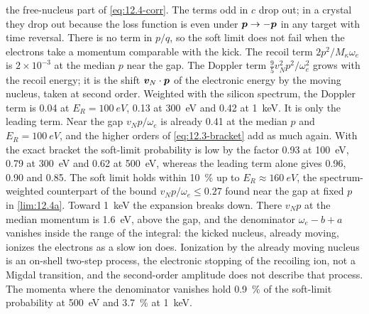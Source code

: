 the free-nucleus part of \cref{eq:12.4-corr}. The terms odd in $c$ drop out; in a crystal they drop out because the loss function is even under $\bm{p} \to -\bm{p}$ in any target with time reversal. There is no term in $p/q$, so the soft limit does not fail when the electrons take a momentum comparable with the kick. The recoil term $2p^2/M_\kappa\omega_e$ is $2\times10^{-3}$ at the median $p$ near the gap. The Doppler term $\tfrac95v_N^2p^2/\omega_e^2$ grows with the recoil energy; it is the shift $\bm{v}_N\cdot\bm{p}$ of the electronic energy by the moving nucleus, taken at second order. Weighted with the silicon spectrum, the Doppler term is 0.04 at $E_R = \SI{100}{eV}$, 0.13 at \SI{300}{eV} and 0.42 at \SI{1}{keV}. It is only the leading term. Near the gap $v_Np/\omega_e$ is already 0.41 at the median $p$ and $E_R = \SI{100}{eV}$, and the higher orders of \cref{eq:12.3-bracket} add as much again. With the exact bracket the soft-limit probability is low by the factor 0.93 at \SI{100}{eV}, 0.79 at \SI{300}{eV} and 0.62 at \SI{500}{eV}, whereas the leading term alone gives 0.96, 0.90 and 0.85. The soft limit holds within \SI{10}{\percent} up to $E_R \approx \SI{160}{eV}$, the spectrum-weighted counterpart of the bound $v_Np/\omega_e \le 0.27$ found near the gap at fixed $p$ in \cref{lim:12.4a}. Toward \SI{1}{keV} the expansion breaks down. There $v_Np$ at the median momentum is \SI{1.6}{eV}, above the gap, and the denominator $\omega_e - b + a$ vanishes inside the range of the integral: the kicked nucleus, already moving, ionizes the electrons as a slow ion does. Ionization by the already moving nucleus is an on-shell two-step process, the electronic stopping of the recoiling ion, not a Migdal transition, and the second-order amplitude does not describe that process. The momenta where the denominator vanishes hold \SI{0.9}{\percent} of the soft-limit probability at \SI{500}{eV} and \SI{3.7}{\percent} at \SI{1}{keV}.
